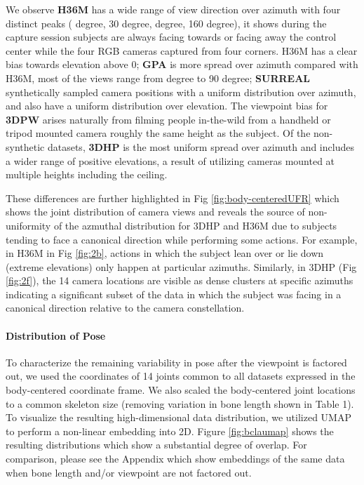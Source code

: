 \documentclass[runningheads]{llncs}
\begin{document}
We observe \textbf{H36M} has a wide range of view direction over azimuth with
four distinct peaks ( degree, 30 degree,  degree, 160 degree), it
shows during the capture session subjects are always facing towards or facing
away the control center while the four RGB cameras captured from four corners.
H36M has a clear bias towards elevation above 0; \textbf{GPA} is more spread
over azimuth compared with H36M, most of the views range from  degree to
90 degree; 
\textbf{SURREAL} synthetically sampled camera positions with a uniform
distribution over azimuth, and also have a uniform 
distribution over elevation. The viewpoint bias for \textbf{3DPW} arises 
naturally from filming people in-the-wild from a handheld or tripod mounted
camera roughly the same height as the subject.
Of the non-synthetic datasets, \textbf{3DHP} is the most uniform spread over
azimuth and includes a wider range of positive elevations, a result of
utilizing cameras mounted at multiple heights including the ceiling. 


These differences are further highlighted in Fig \ref{fig:body-centeredUFR}
which shows the joint distribution of camera views and reveals the source of
non-uniformity of the azmuthal distribution for 3DHP and H36M due to subjects
tending to face a canonical direction while performing some actions.  For
example, in H36M in Fig \ref{fig:2b}, actions in which the subject lean over or
lie down (extreme elevations) only happen at particular azimuths.  Similarly,
in 3DHP (Fig \ref{fig:2f}), the 14 camera locations are visible as dense
clusters at specific azimuths indicating a significant subset of the data in
which the subject was facing in a canonical direction relative to the camera
constellation.

\paragraph{Distribution of Pose}
To characterize the remaining variability in pose after the viewpoint is 
factored out, we used the coordinates of 14 joints common to all datasets 
expressed in the body-centered coordinate frame. We also scaled the
body-centered joint locations to a common skeleton size (removing variation in
bone length shown in Table 1). To visualize the resulting high-dimensional 
data distribution, we utilized UMAP \cite{mcinnes2018umap-software} to perform a non-linear 
embedding into 2D.  Figure \ref{fig:bclaumap} shows the resulting distributions
which show a substantial degree of overlap. For comparison, please see 
the Appendix which show embeddings of the same data when bone length
and/or viewpoint are not factored out.  
\end{document}

